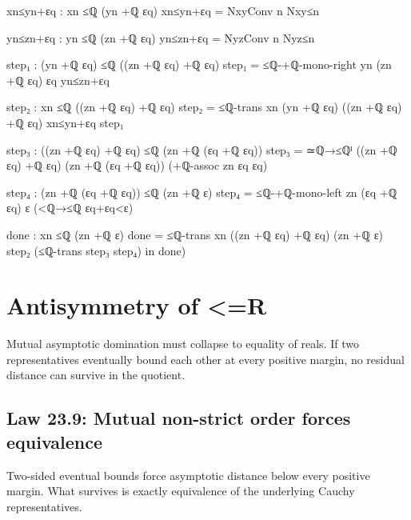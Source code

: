 \documentclass[11pt,a4paper]{book}
\def\mathbb#1{#1}%
\def\texorpdfstring#1#2{#2}%
\begin{document}
\begin{code}
{          xn≤yn+εq : xn ≤ℚ (yn +ℚ εq)
          xn≤yn+εq = NxyConv n Nxy≤n

          yn≤zn+εq : yn ≤ℚ (zn +ℚ εq)
          yn≤zn+εq = NyzConv n Nyz≤n

          step₁ : (yn +ℚ εq) ≤ℚ ((zn +ℚ εq) +ℚ εq)
          step₁ = ≤ℚ-+ℚ-mono-right yn (zn +ℚ εq) εq yn≤zn+εq

          step₂ : xn ≤ℚ ((zn +ℚ εq) +ℚ εq)
          step₂ = ≤ℚ-trans {xn} {(yn +ℚ εq)} {((zn +ℚ εq) +ℚ εq)} xn≤yn+εq step₁

          step₃ : ((zn +ℚ εq) +ℚ εq) ≤ℚ (zn +ℚ (εq +ℚ εq))
          step₃ = ≃ℚ→≤ℚˡ {((zn +ℚ εq) +ℚ εq)} {(zn +ℚ (εq +ℚ εq))} (+ℚ-assoc zn εq εq)

          step₄ : (zn +ℚ (εq +ℚ εq)) ≤ℚ (zn +ℚ ε)
          step₄ = ≤ℚ-+ℚ-mono-left zn (εq +ℚ εq) ε (<ℚ→≤ℚ εq+εq<ε)

          done : xn ≤ℚ (zn +ℚ ε)
          done = ≤ℚ-trans {xn} {((zn +ℚ εq) +ℚ εq)} {(zn +ℚ ε)} step₂ (≤ℚ-trans step₃ step₄)
        in
        done)
  }
\end{code}


\section{Antisymmetry of \texorpdfstring{$\le_{\mathbb{R}}$}{<=R}}

Mutual asymptotic domination must collapse to equality of reals. If two representatives eventually bound each other at every positive margin, no residual distance can survive in the quotient.

\subsection*{Law 23.9: Mutual non-strict order forces equivalence}

Two-sided eventual bounds force asymptotic distance below every positive margin. What survives is exactly equivalence of the underlying Cauchy representatives.
\end{document}
